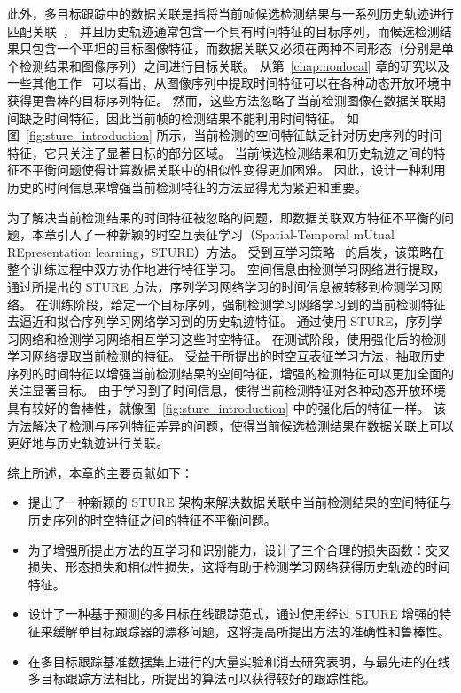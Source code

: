 此外，多目标跟踪中的数据关联是指将当前帧候选检测结果与一系列历史轨迹进行匹配关联~\cite{RN994,RN724}，
并且历史轨迹通常包含一个具有时间特征的目标序列，而候选检测结果只包含一个平坦的目标图像特征，而数据关联又必须在两种不同形态（分别是单个检测结果和图像序列）之间进行目标关联。
从第~\ref{chap:nonlocal} 章的研究以及一些其他工作~\cite{RN969,RN970} 可以看出，从图像序列中提取时间特征可以在各种动态开放环境中获得更鲁棒的目标序列特征。
然而，这些方法忽略了当前检测图像在数据关联期间缺乏时间特征，因此当前帧的检测结果不能利用时间特征。
如图~\ref{fig:sture_introduction} 所示，当前检测的空间特征缺乏针对历史序列的时间特征，它只关注了显著目标的部分区域。
当前候选检测结果和历史轨迹之间的特征不平衡问题使得计算数据关联中的相似性变得更加困难。
因此，设计一种利用历史的时间信息来增强当前检测特征的方法显得尤为紧迫和重要。

为了解决当前检测结果的时间特征被忽略的问题，即数据关联双方特征不平衡的问题，本章引入了一种新颖的时空互表征学习（Spatial-Temporal  mUtual REpresentation learning，STURE）方法。
受到互学习策略~\cite{RN983} 的启发，该策略在整个训练过程中双方协作地进行特征学习。
空间信息由检测学习网络进行提取，通过所提出的 STURE 方法，序列学习网络学习的时间信息被转移到检测学习网络。
在训练阶段，给定一个目标序列，强制检测学习网络学习到的当前检测特征去逼近和拟合序列学习网络学习到的历史轨迹特征。
通过使用 STURE，序列学习网络和检测学习网络相互学习这些时空特征。
在测试阶段，使用强化后的检测学习网络提取当前检测的特征。
受益于所提出的时空互表征学习方法，抽取历史序列的时间特征以增强当前检测结果的空间特征，增强的检测特征可以更加全面的关注显著目标。
由于学习到了时间信息，使得当前检测特征对各种动态开放环境具有较好的鲁棒性，就像图~\ref{fig:sture_introduction} 中的强化后的特征一样。
该方法解决了检测与序列特征差异的问题，使得当前候选检测结果在数据关联上可以更好地与历史轨迹进行关联。

综上所述，本章的主要贡献如下：
\begin{itemize}
	\item  提出了一种新颖的 STURE 架构来解决数据关联中当前检测结果的空间特征与历史序列的时空特征之间的特征不平衡问题。
	\item  为了增强所提出方法的互学习和识别能力，设计了三个合理的损失函数：交叉损失、形态损失和相似性损失，这将有助于检测学习网络获得历史轨迹的时间特征。
	\item  设计了一种基于预测的多目标在线跟踪范式，通过使用经过 STURE 增强的特征来缓解单目标跟踪器的漂移问题，这将提高所提出方法的准确性和鲁棒性。
	\item  在多目标跟踪基准数据集上进行的大量实验和消去研究表明，与最先进的在线多目标跟踪方法相比，所提出的算法可以获得较好的跟踪性能。
\end{itemize}


